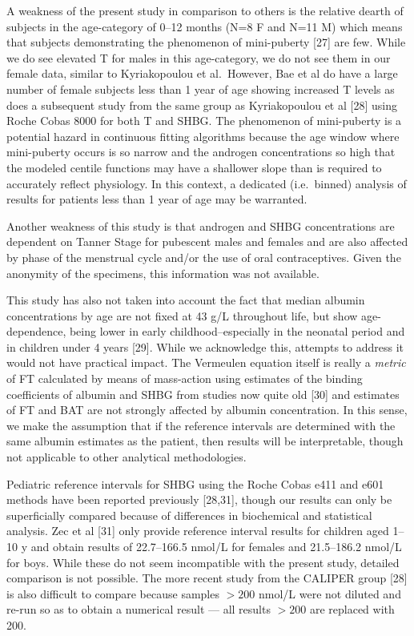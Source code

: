 \documentclass[]{elsarticle} %
\begin{document}
A weakness of the present study in comparison to others is the relative
dearth of subjects in the age-category of 0--12 months (N=8 F and N=11
M) which means that subjects demonstrating the phenomenon of
mini-puberty {[}27{]} are few. While we do see elevated T for males in
this age-category, we do not see them in our female data, similar to
Kyriakopoulou et al.~However, Bae et al do have a large number of female
subjects less than 1 year of age showing increased T levels as does a
subsequent study from the same group as Kyriakopoulou et al {[}28{]}
using Roche Cobas 8000 for both T and SHBG. The phenomenon of
mini-puberty is a potential hazard in continuous fitting algorithms
because the age window where mini-puberty occurs is so narrow and the
androgen concentrations so high that the modeled centile functions may
have a shallower slope than is required to accurately reflect
physiology. In this context, a dedicated (i.e.~binned) analysis of
results for patients less than 1 year of age may be warranted.

Another weakness of this study is that androgen and SHBG concentrations
are dependent on Tanner Stage for pubescent males and females and are
also affected by phase of the menstrual cycle and/or the use of oral
contraceptives. Given the anonymity of the specimens, this information
was not available.

This study has also not taken into account the fact that median albumin
concentrations by age are not fixed at 43 g/L throughout life, but show
age-dependence, being lower in early childhood--especially in the
neonatal period and in children under 4 years {[}29{]}. While we
acknowledge this, attempts to address it would not have practical
impact. The Vermeulen equation itself is really a \emph{metric} of FT
calculated by means of mass-action using estimates of the binding
coefficients of albumin and SHBG from studies now quite old {[}30{]} and
estimates of FT and BAT are not strongly affected by albumin
concentration. In this sense, we make the assumption that if the
reference intervals are determined with the same albumin estimates as
the patient, then results will be interpretable, though not applicable
to other analytical methodologies.

Pediatric reference intervals for SHBG using the Roche Cobas e411 and
e601 methods have been reported previously {[}28,31{]}, though our
results can only be superficially compared because of differences in
biochemical and statistical analysis. Zec et al {[}31{]} only provide
reference interval results for children aged 1--10 y and obtain results
of 22.7--166.5 nmol/L for females and 21.5--186.2 nmol/L for boys. While
these do not seem incompatible with the present study, detailed
comparison is not possible. The more recent study from the CALIPER group
{[}28{]} is also difficult to compare because samples \(>200\) nmol/L
were not diluted and re-run so as to obtain a numerical result --- all
results \(>200\) are replaced with 200.
\end{document}
